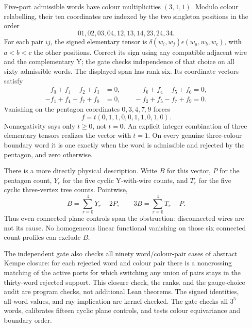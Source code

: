 Five-port admissible words have colour multiplicities $(3,1,1)$.
Modulo colour relabelling, their ten coordinates are indexed by the two
singleton positions in the order
\[
  01,02,03,04,12,13,14,23,24,34.
\]
For each pair $ij$, the signed elementary tensor is
$\delta(w_i,w_j)\epsilon(w_a,w_b,w_c)$, with $a<b<c$ the other
positions. Correct its sign using any compatible adjacent wire and the
complementary Y; the gate checks independence of that choice on all sixty
admissible words. The displayed span has rank six. Its coordinate
vectors satisfy
\[
\begin{split}
 -f_0+f_1-f_2+f_3&=0,\qquad -f_0+f_4-f_5+f_6=0,\\
 -f_1+f_4-f_7+f_8&=0,\qquad -f_2+f_5-f_7+f_9=0.
\end{split}
\]
Vanishing on the pentagon coordinates $0,3,4,7,9$ forces
\[
             f=t(0,1,1,0,0,1,1,0,1,0).
\]
Nonnegativity says only $t\geq0$, not $t=0$.
An explicit integer combination of three elementary tensors realizes
the vector with $t=1$. On every genuine three-colour boundary word it
is one exactly when the word is admissible and rejected by the pentagon,
and zero otherwise.

There is a more directly physical description. Write $B$ for this vector,
$P$ for the pentagon count, $Y_r$ for the five cyclic Y-with-wire counts,
and $T_r$ for the five cyclic three-vertex tree counts. Pointwise,
\[
              B=\sum_{r=0}^4Y_r-2P,
       \qquad 3B=\sum_{r=0}^4T_r-P.
\]
Thus even connected plane controls span the obstruction: disconnected
wires are not its cause. No homogeneous linear functional vanishing on
those six connected count profiles can exclude $B$.

The independent gate also checks all ninety word/colour-pair cases of
abstract Kempe closure: for each rejected word and colour pair there is
a noncrossing matching of the active ports for which switching any union
of pairs stays in the thirty-word rejected support. This closure check,
the ranks, and the gauge-choice audit are program checks, not additional
Lean theorems. The signed identities, all-word values, and ray implication
are kernel-checked. The gate checks all $3^5$ words, calibrates fifteen
cyclic plane controls, and tests colour equivariance and boundary order.


